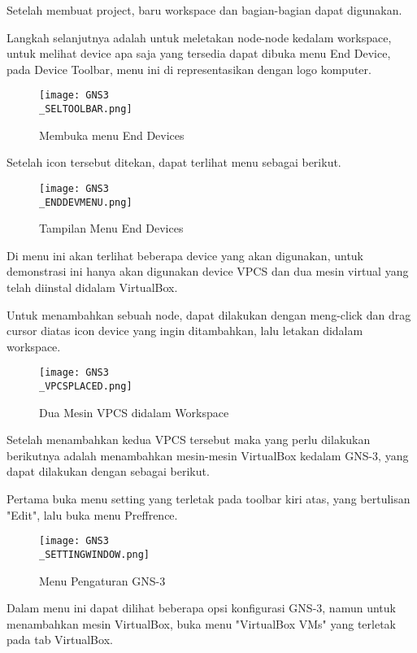 \documentclass[12pt, a4paper]{article}
\begin{document}
      Setelah membuat project, baru workspace dan bagian-bagian dapat digunakan.


      Langkah selanjutnya adalah untuk meletakan node-node kedalam workspace,
      untuk melihat device apa saja yang tersedia dapat dibuka menu End Device,
      pada Device Toolbar, menu ini di representasikan dengan logo komputer.

      \begin{figure}[h]
          \centering
          \texttt{[image: GNS3\\\_SELTOOLBAR.png]}
          \caption{\small{Membuka menu End Devices}}
      \end{figure}

      Setelah icon tersebut ditekan, dapat terlihat menu sebagai berikut.

      \begin{figure}[h]
          \centering
          \texttt{[image: GNS3\\\_ENDDEVMENU.png]}
          \caption{\small{Tampilan Menu End Devices}}
      \end{figure}

      Di menu ini akan terlihat beberapa device yang akan digunakan, untuk
      demonstrasi ini hanya akan digunakan device VPCS dan dua mesin virtual
      yang telah diinstal didalam VirtualBox.

      Untuk menambahkan sebuah node, dapat dilakukan dengan meng-click dan drag
      cursor diatas icon device yang ingin ditambahkan, lalu letakan didalam 
      workspace.

      \begin{figure}[h]
          \centering
          \texttt{[image: GNS3\\\_VPCSPLACED.png]}
          \caption{\small{Dua Mesin VPCS didalam Workspace}}
      \end{figure}

      Setelah menambahkan kedua VPCS tersebut maka yang perlu dilakukan berikutnya
      adalah menambahkan mesin-mesin VirtualBox kedalam GNS-3, yang dapat dilakukan
      dengan sebagai berikut.

      Pertama buka menu setting yang terletak pada toolbar kiri atas, yang
      bertulisan "Edit", lalu buka menu Preffrence.

      \begin{figure}[h]
          \centering
          \texttt{[image: GNS3\\\_SETTINGWINDOW.png]}
          \caption{\small{Menu Pengaturan GNS-3}}
      \end{figure}

      Dalam menu ini dapat dilihat beberapa opsi konfigurasi GNS-3, namun untuk
      menambahkan mesin VirtualBox, buka menu "VirtualBox VMs" yang terletak
      pada tab VirtualBox.
\end{document}
